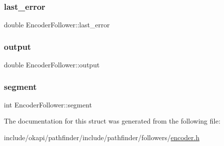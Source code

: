 \mbox{\label{structEncoderFollower_ac0e3830d4438eedeb7075557177a9fb4}} 
\subsubsection{\texorpdfstring{last\_error}{last\_error}}
{\footnotesize\ttfamily double Encoder\+Follower\+::last\+\_\+error}

\mbox{\label{structEncoderFollower_ada75b37fe615fb41e460a6bc356069fa}} 
\subsubsection{\texorpdfstring{output}{output}}
{\footnotesize\ttfamily double Encoder\+Follower\+::output}

\mbox{\label{structEncoderFollower_a04da7958d8cb5556ebfe0e39bbc4e1a5}} 
\subsubsection{\texorpdfstring{segment}{segment}}
{\footnotesize\ttfamily int Encoder\+Follower\+::segment}



The documentation for this struct was generated from the following file\+:\begin{DoxyCompactItemize}
\item 
include/okapi/pathfinder/include/pathfinder/followers/\mbox{\hyperlink{encoder_8h}{encoder.\+h}}\end{DoxyCompactItemize}
